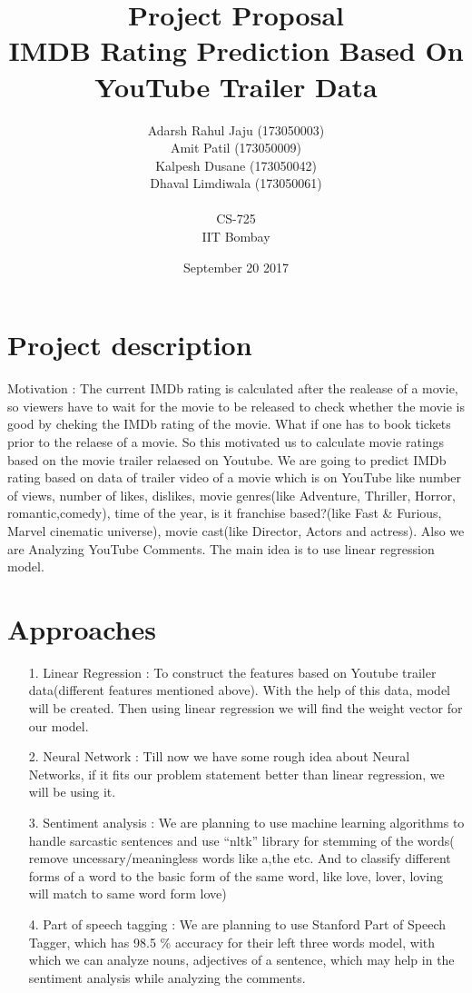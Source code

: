 \documentclass[12pt]{article}
\title{{ \small Project Proposal }\\ IMDB Rating Prediction Based On YouTube Trailer Data}
\author{Adarsh Rahul Jaju (173050003) \\ Amit Patil (173050009) \\ Kalpesh Dusane (173050042) \\ Dhaval Limdiwala (173050061) \\ \\ CS-725 \\ IIT Bombay}
\date{September 20 2017}
\begin{document}
\maketitle
\pagebreak
\tableofcontents
\pagebreak
\section{Project description}
Motivation : The current IMDb rating is calculated after the realease of a movie, so viewers have to wait for the movie to be released to check whether the movie is good by cheking the  IMDb rating of the movie. What if one has to book tickets prior to the relaese of a movie. So this motivated us to calculate movie ratings based on the movie trailer relaesed on Youtube.
\newline
We are going to predict IMDb rating based on data of trailer video of a movie  which is on YouTube like number of views, number of likes, dislikes, movie genres(like Adventure, Thriller, Horror, romantic,comedy), time of the year, is it franchise based?(like Fast \& Furious, Marvel cinematic universe), movie cast(like Director, Actors and actress). Also we are Analyzing YouTube Comments. The main idea is to use linear regression model.


\section{Approaches}

\begin{itemize}	
	\item[1. ] Linear Regression : To construct the features based on Youtube trailer data(different features mentioned above). With the help of this data, model will be created. Then using linear regression we will find the weight vector for our model.
	
	\item[2. ] Neural Network : Till now we have some rough idea about Neural Networks, if it fits our problem statement better than linear regression, we will be using it.
	
	\item[3. ] Sentiment analysis : We are planning to use machine learning algorithms to handle sarcastic sentences and use “nltk” library for stemming of the words( remove uncessary/meaningless words like a,the etc. And to classify different forms of a word to the basic form of the same word, like love, lover, loving will match to same word form love)
	
	\item[4. ] Part of speech tagging : We are planning to use Stanford Part of Speech Tagger, which has 98.5 \% accuracy for their left three words model, with which we can analyze nouns, adjectives of a sentence, which may help in the sentiment analysis while analyzing the comments.

\end{itemize}
	
\end{document}

